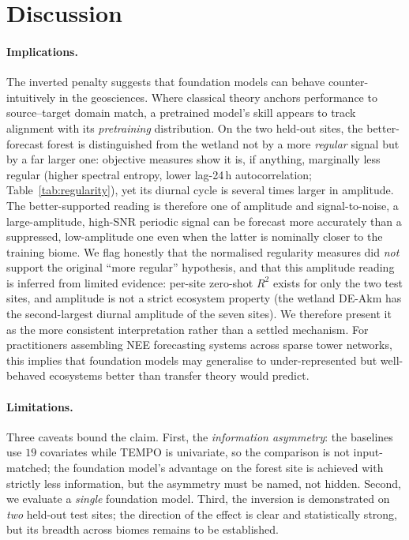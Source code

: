 \documentclass[sigconf]{acmart}          %
\begin{document}
\section{Discussion}

\paragraph{Implications.}
The inverted penalty suggests that foundation models can behave
counter-intuitively in the geosciences. Where classical theory anchors
performance to source--target domain match, a pretrained model's skill appears
to track alignment with its \emph{pretraining} distribution. On the two
held-out sites, the better-forecast forest is distinguished from the wetland
not by a more \emph{regular} signal but by a far larger one: objective measures
show it is, if anything, marginally less regular (higher spectral entropy, lower
lag-24\,h autocorrelation; Table~\ref{tab:regularity}), yet its diurnal cycle is
several times larger in amplitude. The better-supported reading is therefore one
of amplitude and signal-to-noise, a large-amplitude, high-SNR periodic signal
can be forecast more accurately than a suppressed, low-amplitude one even when
the latter is nominally closer to the training biome. We flag honestly that the
normalised regularity measures did \emph{not} support the original ``more
regular'' hypothesis, and that this amplitude reading is inferred from limited
evidence: per-site zero-shot $R^2$ exists for only the two test sites, and
amplitude is not a strict ecosystem property (the wetland DE-Akm has the
second-largest diurnal amplitude of the seven sites). We therefore present it as
the more consistent interpretation rather than a settled mechanism.
For practitioners assembling NEE forecasting systems across sparse tower
networks, this implies that foundation models may generalise to
under-represented but well-behaved ecosystems better than transfer theory
would predict.

\paragraph{Limitations.}
Three caveats bound the claim. First, the \emph{information asymmetry}: the
baselines use $19$ covariates while TEMPO is univariate, so the comparison is
not input-matched; the foundation model's advantage on the forest site is
achieved with strictly less information, but the asymmetry must be named, not
hidden. Second, we evaluate a \emph{single} foundation model. Third, the
inversion is demonstrated on \emph{two} held-out test sites; the direction of
the effect is clear and statistically strong, but its breadth across biomes
remains to be established.
\end{document}
